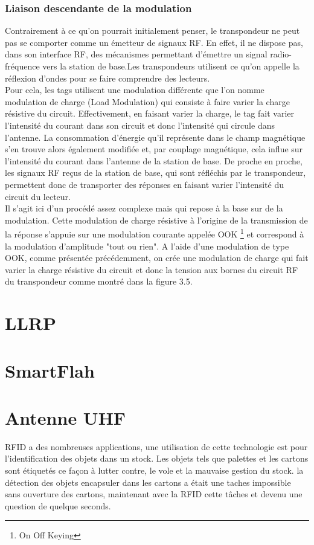 \documentclass[11pt, a4paper, twoside]{book}
\begin{document}
\subsubsection{Liaison descendante de la modulation}
Contrairement à ce qu'on pourrait initialement penser, le transpondeur ne peut pas se comporter comme un émetteur de signaux RF. En effet, il ne dispose pas, dans son interface RF, des mécanismes permettant d'émettre un signal radio-fréquence vers la station de base.Les transpondeurs utilisent ce qu'on appelle la réflexion d'ondes pour se faire comprendre des lecteurs. \\

Pour cela, les tags utilisent une modulation différente que l'on nomme modulation de charge (Load Modulation) qui consiste à faire varier la charge résistive du circuit. Effectivement, en faisant varier la charge, le tag fait varier l'intensité du courant dans son circuit et donc l'intensité qui circule dans l'antenne. La consommation d'énergie qu'il représente dans le champ magnétique s'en trouve alors également modifiée et, par couplage magnétique, cela influe sur l'intensité du courant dans l'antenne de la station de base. De proche en proche, les signaux RF reçus de la station de base, qui sont réfléchis par le transpondeur, permettent donc de transporter des réponses en faisant varier l'intensité du circuit du lecteur.\\

Il s'agit ici d'un procédé assez complexe mais qui repose à la base sur de la modulation. Cette modulation de charge résistive à l'origine de la transmission de la réponse s'appuie sur une modulation courante appelée OOK \footnote{On Off Keying} et correspond à la modulation d'amplitude "tout ou rien". A l'aide d'une modulation de type OOK, comme présentée précédemment, on crée une modulation de charge qui fait varier la charge résistive du circuit et donc la tension aux bornes du circuit RF du transpondeur comme montré dans la figure 3.5.
\section{LLRP}
\section{SmartFlah}
\pagebreak
\section{Antenne UHF}
RFID a des nombreuses applications, une utilisation de cette technologie est pour l'identification des objets dans un stock. Les objets tels que palettes et les cartons sont étiquetés ce façon à lutter contre, le vole et la mauvaise gestion du stock. la détection des objets encapsuler dans les cartons a était une taches impossible sans ouverture des cartons, maintenant avec la RFID cette tâches et devenu une question de quelque seconds.
\end{document}
